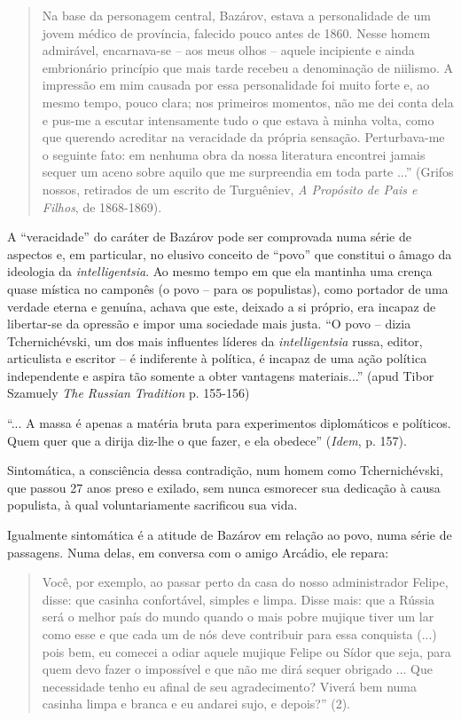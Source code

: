 \begin{quote}
Na base da personagem central, Bazárov, estava a personalidade de um
jovem médico de província, falecido pouco antes de 1860. Nesse homem
admirável, encarnava-se -- aos meus olhos -- aquele incipiente e ainda
embrionário princípio que mais tarde recebeu a denominação de niilismo.
A impressão em mim causada por essa personalidade foi muito forte e, ao
mesmo tempo, pouco clara; nos primeiros momentos, não me dei conta dela
e pus-me a escutar intensamente tudo o que estava à minha volta, como
que querendo acreditar na veracidade da própria sensação. Perturbava-me
o seguinte fato: em nenhuma obra da nossa literatura encontrei jamais
sequer um aceno sobre aquilo que me surpreendia em toda parte ...''
(Grifos nossos, retirados de um escrito de Turguêniev, \emph{A Propósito
de Pais e Filhos}, de 1868-1869).
\end{quote}

A ``veracidade'' do caráter de Bazárov pode ser comprovada numa série de
aspectos e, em particular, no elusivo conceito de ``povo'' que constitui
o âmago da ideologia da \emph{intelligentsia}. Ao mesmo tempo em que ela
mantinha uma crença quase mística no camponês (o povo -- para os
populistas), como portador de uma verdade eterna e genuína, achava que
este, deixado a si próprio, era incapaz de libertar-se da opressão e
impor uma sociedade mais justa. ``O povo -- dizia Tchernichévski, um dos
mais influentes líderes da \emph{intelligentsia} russa, editor,
articulista e escritor -- é indiferente à política, é incapaz de uma
ação política independente e aspira tão somente a obter vantagens
materiais...'' (apud Tibor Szamuely \emph{The Russian} { }
\emph{Tradition} p. 155-156)

``... A massa é apenas a matéria bruta para experimentos diplomáticos e
políticos. Quem quer que a dirija diz-lhe o que fazer, e ela obedece''
(\emph{Idem}, p. 157).

Sintomática, a consciência dessa contradição, num homem como
Tchernichévski, que passou 27 anos preso e exilado, sem nunca esmorecer
sua dedicação à causa populista, à qual voluntariamente sacrificou sua
vida.

Igualmente sintomática é a atitude de Bazárov em relação ao povo, numa
série de passagens. Numa delas, em conversa com o amigo Arcádio, ele
repara:

\begin{quote}
Você, por exemplo, ao passar perto da casa do nosso administrador
Felipe, disse: que casinha confortável, simples e limpa. Disse mais: que
a Rússia será o melhor país do mundo quando o mais pobre mujique tiver
um lar como esse e que cada um de nós deve contribuir para essa
conquista (...) pois bem, eu comecei a odiar aquele mujique Felipe ou
Sídor que seja, para quem devo fazer o impossível e que não me dirá
sequer obrigado ... Que necessidade tenho eu afinal de seu
agradecimento? Viverá bem numa casinha limpa e branca e eu andarei sujo,
e depois?'' (2).
\end{quote}

